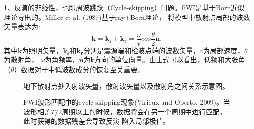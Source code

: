 1、反演的非线性，也即周波跳跃（Cycle-skipping）问题。FWI是基于Born近似理论导出的。Miller et
al. (1987)\cite{MillerEtAl1987}基于ray+Born理论，
将模型中散射点局部的波数矢量表达为:
\begin{equation}
    \mathbf{k}=\mathbf{k_s}+\mathbf{k_r}=\frac{\omega}{v}cos\frac{\theta}{2}\mathbf{n},
    \label{eq:Modelwnb}
\end{equation}
其中$\mathbf{k}$为照明矢量，$\mathbf{k_s}$和$\mathbf{k_r}$分别是震源端和检波点端的波数矢量，$v$为局部速度，$\theta$为散射角，
$\omega$为角频率，$\mathbf{n}$为$\mathbf{k}$方向的单位向量。由上式可以看出，低频和大张角（$\theta$）数据对于中低波数成分的恢复至关重要。
\begin{figure}[!htb] 
   \centering 
   \caption{地下散射点处入射波矢量，散射波矢量以及散射角之间关系示意图。}
   \label{fig:WavenumberVector}
\end{figure}
\begin{figure}[b] 
   \centering 
   \caption{FWI波形匹配中的cycle-skipping现象(Virieux and Operto,
	   2009\cite{virieux2009overview})。当波形相差$T/2$周期以上的时候，数据将会在另一个周期中进行匹配，此时获得的数据残差会导致反演
   陷入局部极值。}
   \label{fig:Cycleskipping}
\end{figure}
